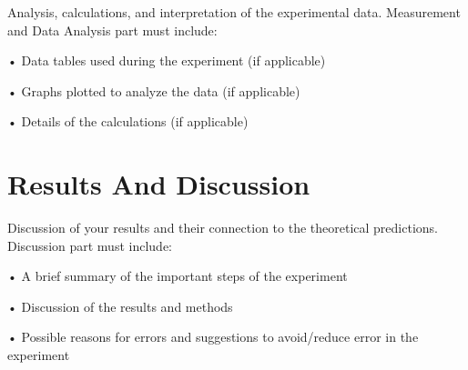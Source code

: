 \documentclass[12pt]{extarticle}
\begin{document}
	Analysis, calculations, and interpretation of the experimental data. Measurement and Data Analysis part must include:
	
	•	Data tables used during the experiment (if applicable)
	
	•	Graphs plotted to analyze the data (if applicable)
	
	•	Details of the calculations (if applicable) 
	
	
	\section{Results And Discussion}
	
	Discussion of your results and their connection to the theoretical predictions. Discussion part must include:
	
	•	A brief summary of the important steps of the experiment
	
	•	Discussion of the results and methods
	
	•	Possible reasons for errors and suggestions to avoid/reduce error in the experiment 
	
	
	\nocite{*}
			
		
\end{document}

